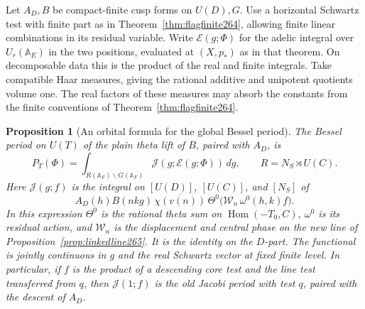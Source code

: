 \documentclass[a4paper,11pt]{article}
\newtheorem{proposition}{Proposition}[section]
\theoremstyle{definition}
\theoremstyle{remark}
\numberwithin{equation}{section}
\begin{document}
Let \(A_D,B\) be compact-finite cusp forms on \(U(D),G\).
Use a horizontal Schwartz test with finite part as in
Theorem~\ref{thm:flagfinite264}, allowing finite linear
combinations in its residual variable. Write
\(\mathcal E(g;\Phi)\) for the adelic integral over
\(U_r(\mathbb A_E)\) in the two positions, evaluated at
\((X,p_*)\) as in that theorem. On decomposable data this is
the product of the real and finite integrals. Take compatible
Haar measures, giving the rational additive and unipotent
quotients volume one. The real factors of these measures may
absorb the constants from the finite conventions of
Theorem~\ref{thm:flagfinite264}.

\begin{proposition}[An orbital formula for the global Bessel period]\leavevmode
\label{prop:besorbit265}
The Bessel period on \(U(T)\) of the plain theta lift of \(B\),
paired with \(A_D\), is
\[
 P_T(\Phi)=\int_{R(\mathbb A_F)\backslash G(\mathbb A_F)}
           \mathcal J(g;\mathcal E(g;\Phi))\,d\dot g ,
 \qquad R=N_S\rtimes U(C).
\]
Here \(\mathcal J(g;f)\) is the integral on
\([U(D)]\), \([U(C)]\), and \([N_S]\) of
\[
 A_D(h)B(nk g)\,\overline{\chi(v(n))}\,
      \Theta^0\big(\mathcal W_n\,\omega^0(h,k)f\big).
\]
In this expression \(\Theta^0\) is the rational theta sum on
\(\operatorname{Hom}(-T_0,C)\), \(\omega^0\) is its residual
action, and \(\mathcal W_n\) is the displacement and central
phase on the new line of Proposition~\ref{prop:linkedline265}.
It is the identity on the \(D\)-part. The functional is jointly
continuous in \(g\) and the real Schwartz vector at fixed finite
level. In particular, if \(f\) is the product of a descending
core test and the line test transferred from \(q\), then
\(\mathcal J(1;f)\) is the old Jacobi period with test \(q\),
paired with the descent of \(A_D\).
\end{proposition}
\end{document}
